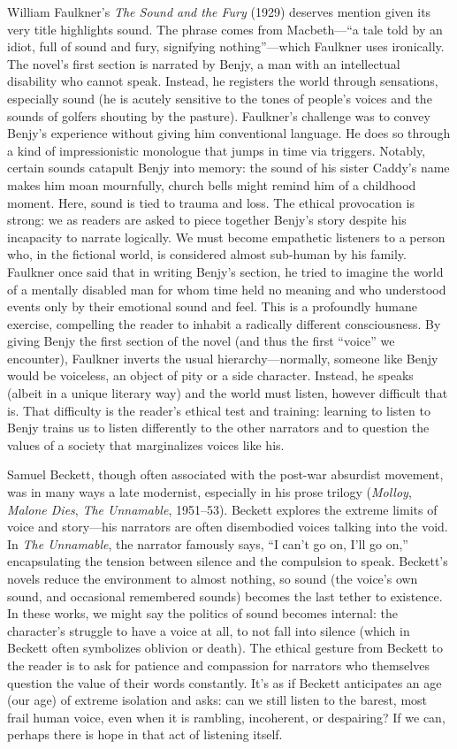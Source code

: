 \documentclass[12pt]{report}
\begin{document}
William Faulkner’s \textit{The Sound and the Fury} (1929) deserves mention given its very title highlights sound. The phrase comes from Macbeth—“a tale told by an idiot, full of sound and fury, signifying nothing”—which Faulkner uses ironically. The novel’s first section is narrated by Benjy, a man with an intellectual disability who cannot speak. Instead, he registers the world through sensations, especially sound (he is acutely sensitive to the tones of people’s voices and the sounds of golfers shouting by the pasture). Faulkner’s challenge was to convey Benjy’s experience without giving him conventional language. He does so through a kind of impressionistic monologue that jumps in time via triggers. Notably, certain sounds catapult Benjy into memory: the sound of his sister Caddy’s name makes him moan mournfully, church bells might remind him of a childhood moment. Here, sound is tied to trauma and loss. The ethical provocation is strong: we as readers are asked to piece together Benjy’s story despite his incapacity to narrate logically. We must become empathetic listeners to a person who, in the fictional world, is considered almost sub-human by his family. Faulkner once said that in writing Benjy’s section, he tried to imagine the world of a mentally disabled man for whom time held no meaning and who understood events only by their emotional sound and feel. This is a profoundly humane exercise, compelling the reader to inhabit a radically different consciousness. By giving Benjy the first section of the novel (and thus the first “voice” we encounter), Faulkner inverts the usual hierarchy—normally, someone like Benjy would be voiceless, an object of pity or a side character. Instead, he speaks (albeit in a unique literary way) and the world must listen, however difficult that is. That difficulty is the reader’s ethical test and training: learning to listen to Benjy trains us to listen differently to the other narrators and to question the values of a society that marginalizes voices like his.

Samuel Beckett, though often associated with the post-war absurdist movement, was in many ways a late modernist, especially in his prose trilogy (\textit{Molloy}, \textit{Malone Dies}, \textit{The Unnamable}, 1951–53). Beckett explores the extreme limits of voice and story—his narrators are often disembodied voices talking into the void. In \textit{The Unnamable}, the narrator famously says, “I can’t go on, I’ll go on,” encapsulating the tension between silence and the compulsion to speak. Beckett’s novels reduce the environment to almost nothing, so sound (the voice’s own sound, and occasional remembered sounds) becomes the last tether to existence. In these works, we might say the politics of sound becomes internal: the character’s struggle to have a voice at all, to not fall into silence (which in Beckett often symbolizes oblivion or death). The ethical gesture from Beckett to the reader is to ask for patience and compassion for narrators who themselves question the value of their words constantly. It’s as if Beckett anticipates an age (our age) of extreme isolation and asks: can we still listen to the barest, most frail human voice, even when it is rambling, incoherent, or despairing? If we can, perhaps there is hope in that act of listening itself.
\end{document}
